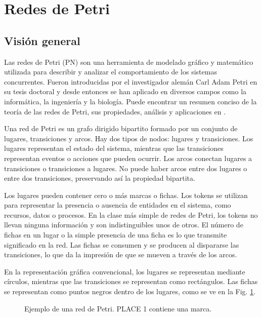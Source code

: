 \section{Redes de Petri}

\subsection{Visión general}

Las redes de Petri (\acrfull{PN}) son una herramienta de modelado gráfico y matemático utilizada para
describir y analizar el comportamiento de los sistemas concurrentes. Fueron introducidas por el
investigador alemán Carl Adam Petri en su tesis doctoral \cite{petri1962} y desde entonces se han aplicado en diversos
campos como la informática, la ingeniería y la biología. Puede encontrar un resumen conciso
de la teoría de las redes de Petri, sus propiedades, análisis y aplicaciones en \cite{murata1989}.

Una red de Petri es un grafo dirigido bipartito formado por un conjunto de lugares, transiciones
y arcos. Hay dos tipos de nodos: lugares y transiciones. Los lugares representan el estado del
sistema, mientras que las transiciones representan eventos o acciones que pueden ocurrir. Los
arcos conectan lugares a transiciones o transiciones a lugares. No puede haber arcos entre
dos lugares o entre dos transiciones, preservando así la propiedad bipartita.

Los lugares pueden contener cero o más marcas o fichas. Los tokens se utilizan para representar la
presencia o ausencia de entidades en el sistema, como recursos, datos o procesos. En la clase
más simple de redes de Petri, los tokens no llevan ninguna información y son indistinguibles
unos de otros. El número de fichas en un lugar o la simple presencia de una ficha es lo que
transmite significado en la red. Las fichas se consumen y se producen al dispararse las
transiciones, lo que da la impresión de que se mueven a través de los arcos.

En la representación gráfica convencional, los lugares se representan mediante círculos,
mientras que las transiciones se representan como rectángulos. Las fichas se representan como
puntos negros dentro de los lugares, como se ve en la Fig. \ref{fig:petri-net-example}.

\begin{figure}[!htb]
      \centering
      
      \caption{Ejemplo de una red de Petri. \uppercase{PLACE 1} contiene una marca.}
      \label{fig:petri-net-example}
\end{figure}

